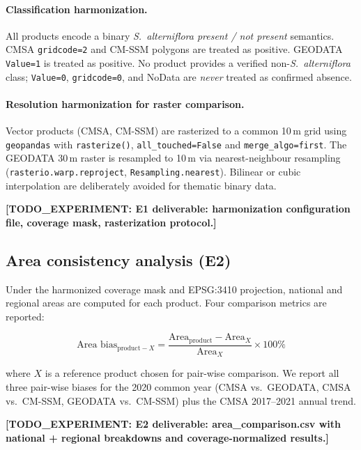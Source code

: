 \documentclass[11pt]{article}
\newcommand{\TODOEXP}[1]{\textcolor{todocolor}{\textbf{[TODO_EXPERIMENT: #1]}}}
\begin{document}
\paragraph{Classification harmonization.} All products encode a binary
\textit{S.~alterniflora present / not present} semantics. CMSA \texttt{gridcode=2}
and CM-SSM polygons are treated as positive. GEODATA \texttt{Value=1} is
treated as positive. No product provides a verified non-\textit{S.~alterniflora}
class; \texttt{Value=0}, \texttt{gridcode=0}, and NoData are \emph{never} treated
as confirmed absence.

\paragraph{Resolution harmonization for raster comparison.} Vector products (CMSA,
CM-SSM) are rasterized to a common 10\,m grid using \texttt{geopandas} with
\texttt{rasterize()}, \texttt{all\_touched=False} and \texttt{merge\_algo=first}.
The GEODATA 30\,m raster is resampled to 10\,m via nearest-neighbour
resampling (\texttt{rasterio.warp.reproject}, \texttt{Resampling.nearest}).
Bilinear or cubic interpolation are deliberately avoided for thematic binary
data.

\TODOEXP{E1 deliverable: harmonization configuration file, coverage mask,
rasterization protocol.}

\subsection{Area consistency analysis (E2)}

Under the harmonized coverage mask and EPSG:3410 projection, national and
regional areas are computed for each product. Four comparison metrics are
reported:

\begin{equation}
\text{Area bias}_{\text{product}-X} =
\frac{\text{Area}_{\text{product}} - \text{Area}_X}{\text{Area}_X} \times 100\%
\label{eq:bias}
\end{equation}

where $X$ is a reference product chosen for pair-wise comparison. We report
all three pair-wise biases for the 2020 common year (CMSA vs.\ GEODATA, CMSA vs.\
CM-SSM, GEODATA vs.\ CM-SSM) plus the CMSA 2017--2021 annual trend.

\TODOEXP{E2 deliverable: area\_comparison.csv with national + regional breakdowns
and coverage-normalized results.}
\end{document}
